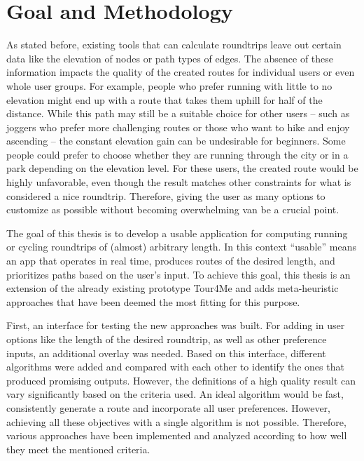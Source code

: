 


\section{Goal and Methodology}
\label{sec:goal}

As stated before, existing tools that can calculate roundtrips leave out certain data like the elevation of nodes or path types of edges.
The absence of these information impacts the quality of the created routes for individual users or even whole user groups. 
For example, people who prefer running with little to no elevation might end up with a route that takes them uphill for half of the distance.
While this path may still be a suitable choice for other users -- such as joggers who prefer more challenging routes or those who want to hike and enjoy ascending -- the constant elevation gain can be undesirable for beginners.
Some people could prefer to choose whether they are running through the city or in a park depending on the elevation level.
For these users, the created route would be highly unfavorable, even though the result matches other constraints for what is considered a nice roundtrip.
Therefore, giving the user as many options to customize as possible without becoming overwhelming van be a crucial point. 


The goal of this thesis is to develop a usable application for computing running or cycling roundtrips of (almost) arbitrary length. 
In this context \enquote{usable} means an app that operates in real time, produces routes of the desired length, and prioritizes paths based on the user's input. 
To achieve this goal, this thesis is an extension of the already existing prototype Tour4Me \cite{buchin_tour4me_2022} and adds meta-heuristic approaches that have been deemed the most fitting for this purpose. 

First, an interface for testing the new approaches was built. 
For adding in user options like the length of the desired roundtrip, as well as other preference inputs, an additional overlay was needed.
Based on this interface, different algorithms were added and compared with each other to identify the ones that produced promising outputs.
However, the definitions of a high quality result can vary significantly based on the criteria used. 
An ideal algorithm would be fast, consistently generate a route and incorporate all user preferences.
However, achieving all these objectives with a single algorithm is not possible. 
Therefore, various approaches have been implemented and analyzed according to how well they meet the mentioned criteria. 

